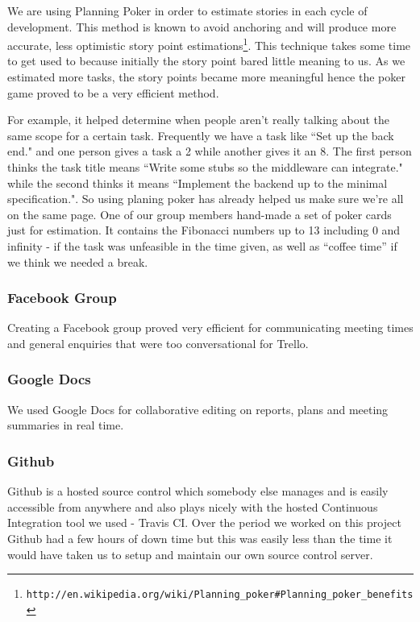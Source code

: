 \documentclass[11pt, a4paper]{article}
\begin{document}
We are using Planning Poker in order to estimate stories in each cycle of development. 
This method is known to avoid anchoring and will produce more accurate, less optimistic story point estimations\footnote{\tt{http://en.wikipedia.org/wiki/Planning\_poker\#Planning\_poker\_benefits}}. This technique takes some time to get used to because initially the story point bared little meaning to us.
As we estimated more tasks, the story points became more meaningful hence the poker game proved to be a very efficient method.

For example, it helped determine when people aren't really talking about the same scope for a certain task.
Frequently we have a task like ``Set up the back end." and one person gives a task a 2 while another gives it an 8.
The first person thinks the task title means ``Write some stubs so the middleware can integrate." while the second thinks it means ``Implement the backend up to the minimal specification.". 
So using planing poker has already helped us make sure we're all on the same page.
One of our group members hand-made a set of poker cards just for estimation.
It contains the Fibonacci numbers up to 13 including 0 and infinity - if the task was unfeasible in the time given, as well as ``coffee time'' if we think we needed a break. 

\subsubsection{Facebook Group}
Creating a Facebook group proved very efficient for communicating meeting times and general enquiries that were too conversational for Trello.

\subsubsection{Google Docs}
We used Google Docs for collaborative editing on reports, plans and meeting summaries in real time.
  
\subsubsection{Github}
Github is a hosted source control which somebody else manages and is easily accessible from anywhere and also plays nicely with the hosted Continuous Integration tool we used - Travis CI.
Over the period we worked on this project Github had a few hours of down time but this was easily less than the time it would have taken us to setup and maintain our own source control server.
\end{document}
